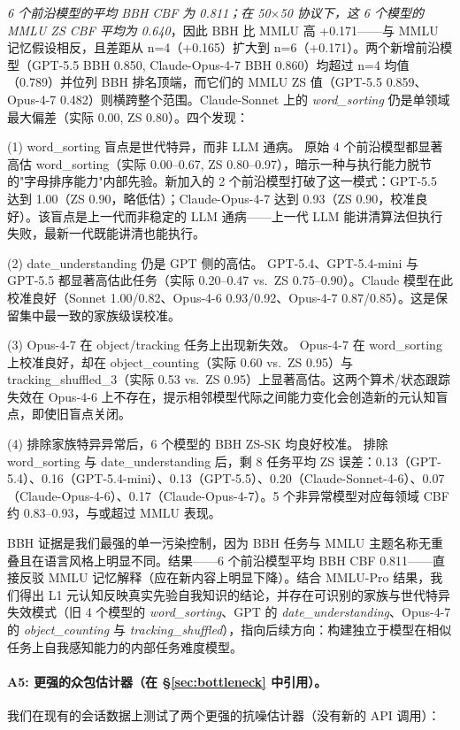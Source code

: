 \documentclass[11pt,a4paper,fontset=fandol]{ctexart}
\begin{document}
\emph{6 个前沿模型的平均 BBH CBF 为 0.811；在 50$\times$50 协议下，这 6 个模型的 MMLU ZS CBF 平均为 0.640}，因此 BBH 比 MMLU 高 +0.171——与 MMLU 记忆假设相反，且差距从 n=4（+0.165）扩大到 n=6（+0.171）。两个新增前沿模型（GPT-5.5 BBH 0.850, Claude-Opus-4-7 BBH 0.860）均超过 n=4 均值（0.789）并位列 BBH 排名顶端，而它们的 MMLU ZS 值（GPT-5.5 0.859、Opus-4-7 0.482）则横跨整个范围。Claude-Sonnet 上的 \emph{word\_sorting} 仍是单领域最大偏差（实际 0.00, ZS 0.80）。四个发现：

(1) word\_sorting 盲点是世代特异，而非 LLM 通病。 原始 4 个前沿模型都显著高估 word\_sorting（实际 0.00--0.67, ZS 0.80--0.97），暗示一种与执行能力脱节的"字母排序能力"内部先验。新加入的 2 个前沿模型打破了这一模式：GPT-5.5 达到 1.00（ZS 0.90，略低估）；Claude-Opus-4-7 达到 0.93（ZS 0.90，校准良好）。该盲点是上一代而非稳定的 LLM 通病——上一代 LLM 能讲清算法但执行失败，最新一代既能讲清也能执行。

(2) date\_understanding 仍是 GPT 侧的高估。 GPT-5.4、GPT-5.4-mini 与 GPT-5.5 都显著高估此任务（实际 0.20--0.47 vs.\ ZS 0.75--0.90）。Claude 模型在此校准良好（Sonnet 1.00/0.82、Opus-4-6 0.93/0.92、Opus-4-7 0.87/0.85）。这是保留集中最一致的家族级误校准。

(3) Opus-4-7 在 object/tracking 任务上出现新失效。 Opus-4-7 在 word\_sorting 上校准良好，却在 object\_counting（实际 0.60 vs.\ ZS 0.95）与 tracking\_shuffled\_3（实际 0.53 vs.\ ZS 0.95）上显著高估。这两个算术/状态跟踪失效在 Opus-4-6 上不存在，提示相邻模型代际之间能力变化会创造新的元认知盲点，即使旧盲点关闭。

(4) 排除家族特异异常后，6 个模型的 BBH ZS-SK 均良好校准。 排除 word\_sorting 与 date\_understanding 后，剩 8 任务平均 ZS 误差：0.13（GPT-5.4）、0.16（GPT-5.4-mini）、0.13（GPT-5.5）、0.20（Claude-Sonnet-4-6）、0.07（Claude-Opus-4-6）、0.17（Claude-Opus-4-7）。5 个非异常模型对应每领域 CBF 约 0.83--0.93，与或超过 MMLU 表现。

BBH 证据是我们最强的单一污染控制，因为 BBH 任务与 MMLU 主题名称无重叠且在语言风格上明显不同。结果——6 个前沿模型平均 BBH CBF 0.811——直接反驳 MMLU 记忆解释（应在新内容上明显下降）。结合 MMLU-Pro 结果，我们得出 L1 元认知反映真实先验自我知识的结论，并存在可识别的家族与世代特异失效模式（旧 4 个模型的 \emph{word\_sorting}、GPT 的 \emph{date\_understanding}、Opus-4-7 的 \emph{object\_counting} 与 \emph{tracking\_shuffled}），指向后续方向：构建独立于模型在相似任务上自我感知能力的内部任务难度模型。

\paragraph{A5: 更强的众包估计器（在 \S\ref{sec:bottleneck} 中引用）。}
\label{app:ds_glad}
我们在现有的会话数据上测试了两个更强的抗噪估计器（没有新的 API 调用）：
\end{document}
